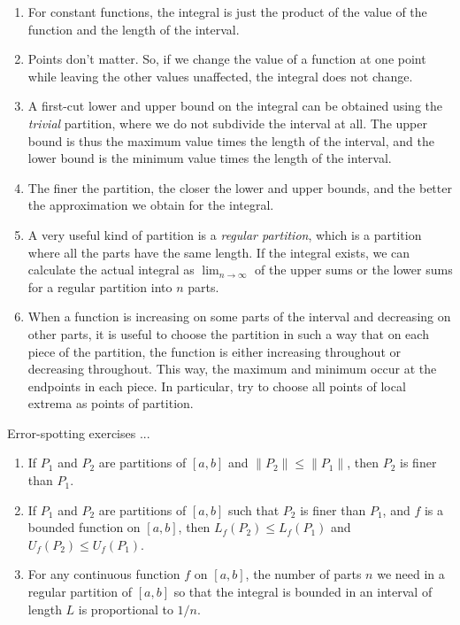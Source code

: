 \documentclass[10pt]{amsart}
\begin{document}
\begin{enumerate}
\item For constant functions, the integral is just the product of the
  value of the function and the length of the interval.
\item Points don't matter. So, if we change the value of a function at
  one point while leaving the other values unaffected, the integral
  does not change.
\item A first-cut lower and upper bound on the integral can be
  obtained using the {\em trivial} partition, where we do not
  subdivide the interval at all. The upper bound is thus the maximum
  value times the length of the interval, and the lower bound is the
  minimum value times the length of the interval.
\item The finer the partition, the closer the lower and upper bounds,
  and the better the approximation we obtain for the integral.
\item A very useful kind of partition is a {\em regular partition},
  which is a partition where all the parts have the same length. If
  the integral exists, we can calculate the actual integral as
  $\lim_{n \to \infty}$ of the upper sums or the lower sums for a
  regular partition into $n$ parts.
\item When a function is increasing on some parts of the interval and
  decreasing on other parts, it is useful to choose the partition in
  such a way that on each piece of the partition, the function is
  either increasing throughout or decreasing throughout. This way, the
  maximum and minimum occur at the endpoints in each piece. In
  particular, try to choose all points of local extrema as points of
  partition.
\end{enumerate}

Error-spotting exercises ...

\begin{enumerate}
\item If $P_1$ and $P_2$ are partitions of $[a,b]$ and $\| P_2 \| \le
  \| P_1 \|$, then $P_2$ is finer than $P_1$.
\item If $P_1$ and $P_2$ are partitions of $[a,b]$ such that $P_2$ is
  finer than $P_1$, and $f$ is a bounded function on $[a,b]$, then
  $L_f(P_2) \le L_f(P_1)$ and $U_f(P_2) \le U_f(P_1)$.
\item For any continuous function $f$ on $[a,b]$, the number of parts
  $n$ we need in a regular partition of $[a,b]$ so that the integral
  is bounded in an interval of length $L$ is proportional to $1/n$.
\end{enumerate}
\end{document}

